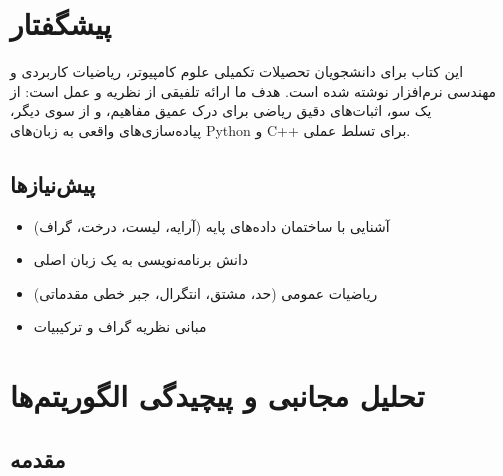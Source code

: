 \documentclass{matinbook}
\begin{document}
    \chapter*{پیشگفتار}
    
    این کتاب برای دانشجویان تحصیلات تکمیلی علوم کامپیوتر،
    ریاضیات کاربردی و مهندسی نرم‌افزار نوشته شده است.
    هدف ما ارائه تلفیقی از نظریه و عمل است: از یک سو،
    اثبات‌های دقیق ریاضی برای درک عمیق مفاهیم،
    و از سوی دیگر، پیاده‌سازی‌های واقعی به زبان‌های
    Python و C++ برای تسلط عملی.
    
    \section*{پیش‌نیازها}
    
    \begin{itemize}
        \item آشنایی با ساختمان داده‌های پایه (آرایه، لیست، درخت، گراف)
        \item دانش برنامه‌نویسی به یک زبان اصلی
        \item ریاضیات عمومی (حد، مشتق، انتگرال، جبر خطی مقدماتی)
        \item مبانی نظریه گراف و ترکیبیات
    \end{itemize}
    
    \clearpage
    
    \tableofcontents
    \clearpage
    \mainmatter
    
    
        \listoffigures
    \clearpage
    
    \listoftables
    \clearpage
    
    \listofalgorithms
    \clearpage
    
    \chapter{تحلیل مجانبی و پیچیدگی الگوریتم‌ها}
    \label{chap:asymptotic}
    
    \section{مقدمه}
    
\end{document}

